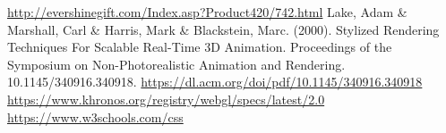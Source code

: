 \documentclass[12pt,a4paper]{article}
\begin{document}
\begin{thebibliography}{1}

   \url{http://evershinegift.com/Index.asp?Product420/742.html}
 Lake, Adam \& Marshall, Carl \& Harris, Mark \& Blackstein, Marc. (2000). Stylized Rendering Techniques For Scalable Real-Time 3D Animation. Proceedings of the Symposium on Non-Photorealistic Animation and Rendering. 10.1145/340916.340918.  \url{https://dl.acm.org/doi/pdf/10.1145/340916.340918}
 \url{https://www.khronos.org/registry/webgl/specs/latest/2.0}
 \url{https://www.w3schools.com/css}

\end{thebibliography}
\end{document}
